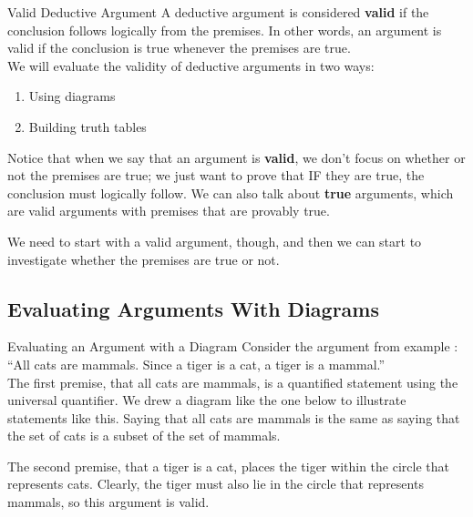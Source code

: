 \begin{proc}{Valid Deductive Argument}
A deductive argument is considered \textbf{valid} if the conclusion follows logically from the premises.  In other words, an argument is valid if the conclusion is true whenever the premises are true.\\

We will evaluate the validity of deductive arguments in two ways:
\begin{enumerate}
\item Using diagrams
\item Building truth tables
\end{enumerate}
\end{proc}

Notice that when we say that an argument is \textbf{valid}, we don't focus on whether or not the premises are true; we just want to prove that IF they are true, the conclusion must logically follow.  We can also talk about \textbf{true} arguments, which are valid arguments with premises that are provably true.

We need to start with a valid argument, though, and then we can start to investigate whether the premises are true or not.

\subsection{Evaluating Arguments With Diagrams}
\begin{example}[https://www.youtube.com/watch?v=j49KYvFiPUQ]{Evaluating an Argument with a Diagram}
Consider the argument from example \thededarg:\\
``All cats are mammals.  Since a tiger is a cat, a tiger is a mammal.''\\

The first premise, that all cats are mammals, is a quantified statement using the universal quantifier.  We drew a diagram like the one below to illustrate statements like this.  Saying that all cats are mammals is the same as saying that the set of cats is a subset of the set of mammals.
\begin{center}
\end{center}
The second premise, that a tiger is a cat, places the tiger within the circle that represents cats.  Clearly, the tiger must also lie in the circle that represents mammals, so this argument is valid.
\end{example}

